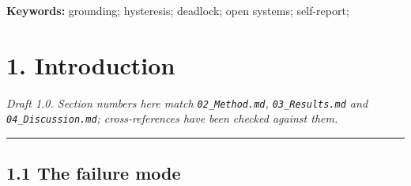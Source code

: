 \documentclass[11pt,a4paper]{article}
\begin{document}
\begin{abstract}
Finally we report a controlled ablation in a 100-agent sandbox. Type-A commits a
fixed scope and reads only its own log; Type-B commits a scope that is a function
of the world's verdict. Both face the same capacity trajectory. Type-A stops
delivering permanently at cycle 100, dies at 107, and its own log ends 15.56\%
above what landed. Type-B is stranded at 279. The lifetime ratio is \textbf{2.61},
not the 9.19
that the previous draft reported; the difference is a unit error in the wake
gate, which we isolate as a three-way sensitivity table (2.61 / 2.18 / 9.19).
Wiring the \texttt{INVALID} channel into Type-A --- and changing nothing else --- is
sufficient for it to survive the same 300 cycles with a zero log gap. The
channel, not the drift, is what the cliff is made of.

The extinction is scheduled rather than emergent: Corollary 4 places each death
four to seven cycles after the onset, from the upkeep rates alone.

The algebraic skeleton --- the threshold equivalence of Lemma 4, the mutual
exclusion of the two modes, and the totality of the four-valued verdict --- is
machine-checked in Lean 4 (\texttt{Formal\_Verification/Core\_Theorems.lean}): 0 errors,
0 warnings, no \texttt{sorry}, with the \texttt{\#print\ axioms} receipts printed from the
source rather than summarised here.

We make no claim of universality. The contribution is a boundary that can be
checked, three proofs that can be refuted, and a list of the assumptions that
would have to hold for either.

\end{abstract}

\noindent\textbf{Keywords:} grounding; hysteresis; deadlock; open systems; self-report;


\section{1. Introduction}\label{introduction}

\emph{Draft 1.0. Section numbers here match \texttt{02\_Method.md}, \texttt{03\_Results.md} and
\texttt{04\_Discussion.md}; cross-references have been checked against them.}

\begin{center}\rule{0.5\linewidth}{0.5pt}\end{center}

\subsection{1.1 The failure mode}\label{the-failure-mode}
\end{document}
